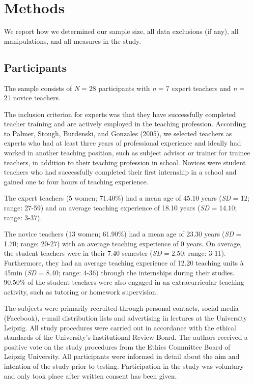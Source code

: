 \documentclass[
  man,floatsintext]{apa6}
\begin{document}
\hypertarget{methods}{%
\section{Methods}\label{methods}}

We report how we determined our sample size, all data exclusions (if any), all manipulations, and all measures in the study.

\hypertarget{participants}{%
\subsection{Participants}\label{participants}}

The sample consists of \emph{N} = 28 participants with \emph{n} = 7 expert teachers and \emph{n} = 21 novice teachers.

The inclusion criterion for experts was that they have successfully completed teacher training and are actively employed in the teaching profession. According to Palmer, Stough, Burdenski, and Gonzales (2005), we selected teachers as experts who had at least three years of professional experience and ideally had worked in another teaching position, such as subject advisor or trainer for trainee teachers, in addition to their teaching profession in school. Novices were student teachers who had successfully completed their first internship in a school and gained one to four hours of teaching experience.

The expert teachers (5 women; 71.40\%) had a mean age of 45.10 years (\emph{SD} = 12; range: 27-59) and an average teaching experience of 18.10 years (\emph{SD} = 14.10; range: 3-37).

The novice teachers (13 women; 61.90\%) had a mean age of 23.30 years (\emph{SD} = 1.70; range: 20-27) with an average teaching experience of 0 years. On average, the student teachers were in their 7.40 semester (\emph{SD} = 2.50; range: 3-11). Furthermore, they had an average teaching experience of 12.20 teaching units à 45min (\emph{SD} = 8.40; range: 4-36) through the internships during their studies. 90.50\% of the student teachers were also engaged in an extracurricular teaching activity, such as tutoring or homework supervision.

The subjects were primarily recruited through personal contacts, social media (Facebook), e-mail distribution lists and advertising in lectures at the University Leipzig. All study procedures were carried out in accordance with the ethical standards of the University's Institutional Review Board. The authors received a positive vote on the study procedures from the Ethics Committee Board of Leipzig University. All participants were informed in detail about the aim and intention of the study prior to testing. Participation in the study was voluntary and only took place after written consent has been given.
\end{document}
